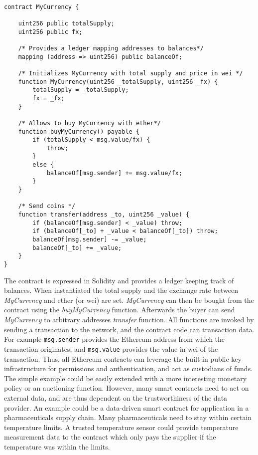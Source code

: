 \begin{verbatim}
 
contract MyCurrency {
  
    uint256 public totalSupply;
    uint256 public fx;

    /* Provides a ledger mapping addresses to balances*/
    mapping (address => uint256) public balanceOf;
  
    /* Initializes MyCurrency with total supply and price in wei */
    function MyCurrency(uint256 _totalSupply, uint256 _fx) {
        totalSupply = _totalSupply; 
        fx = _fx;
    }
    
    /* Allows to buy MyCurrency with ether*/
    function buyMyCurrency() payable {
        if (totalSupply < msg.value/fx) {
            throw;
        }
        else {
            balanceOf[msg.sender] += msg.value/fx;     
        }       
    }

    /* Send coins */
    function transfer(address _to, uint256 _value) {
        if (balanceOf[msg.sender] < _value) throw;           
        if (balanceOf[_to] + _value < balanceOf[_to]) throw;
        balanceOf[msg.sender] -= _value;   
        balanceOf[_to] += _value;                            
    }
}
\end{verbatim}

The contract is expressed in Solidity and provides a ledger keeping track of balances. When instantiated the total supply and the exchange rate between \emph{MyCurrency} and ether (or wei) are set. \emph{MyCurrency} can then be bought from the contract using the \emph{buyMyCurrency} function. Afterwards the buyer can send \emph{MyCurrency} to arbitrary addresses \emph{transfer} function. All functions are invoked by sending a transaction to the network, and the contract code can transaction data. For example \texttt{msg.sender} provides the Ethereum address from which the transaction originates, and \texttt{msg.value} provides the value in wei of the transaction. Thus, all Ethereum contracts can leverage the built-in public key infrastructure for permissions and authentication, and act as custodians of funds. The simple example could be easily extended with a more interesting monetary policy or an auctioning function. However, many smart contracts need to act on external data, and are thus dependent on the trustworthiness of the data provider. An example could be a data-driven smart contract for application in a pharmaceuticals supply chain. Many pharmaceuticals need to stay within certain temperature limits. A trusted temperature sensor could provide temperature measurement data to the contract which only pays the supplier if the temperature was within the limits. 


